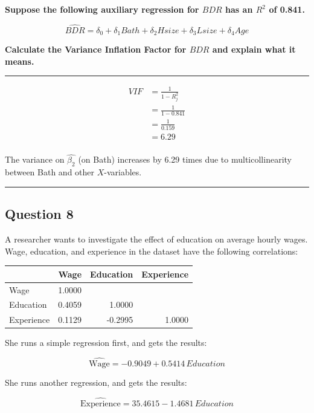 \documentclass[
]{article}
\begin{document}
\textbf{Suppose the following auxiliary regression for \(BDR\) has an
\(R^2\) of 0.841.}

\[\widehat{BDR}=\delta_0+\delta_1Bath+\delta_2Hsize+\delta_3Lsize+\delta_4Age\]

\textbf{Calculate the Variance Inflation Factor for \(BDR\) and explain
what it means.}

\begin{center}\rule{0.5\linewidth}{0.5pt}\end{center}

\[\begin{align*}
VIF&=\frac{1}{1-R^2_j}\\
&=\frac{1}{1-0.841}\\
&=\frac{1}{0.159}\\
&=6.29\\
\end{align*}\]

The variance on \(\hat{\beta_2}\) (on Bath) increases by 6.29 times due
to multicollinearity between Bath and other \(X\)-variables.

\begin{center}\rule{0.5\linewidth}{0.5pt}\end{center}

\hypertarget{question-8}{%
\subsection{Question 8}\label{question-8}}

A researcher wants to investigate the effect of education on average
hourly wages. Wage, education, and experience in the dataset have the
following correlations:

\begin{longtable}[]{@{}lrrr@{}}
\toprule
& Wage & Education & Experience \\
\midrule
\endhead
Wage & 1.0000 & & \\
Education & 0.4059 & 1.0000 & \\
Experience & 0.1129 & -0.2995 & 1.0000 \\
\bottomrule
\end{longtable}

She runs a simple regression first, and gets the results:

\[\widehat{\text{Wage}} = -0.9049 +  0.5414 \, Education\]

She runs another regression, and gets the results:

\[\widehat{\text{Experience}} = 35.4615 - 1.4681 \, Education\]
\end{document}
